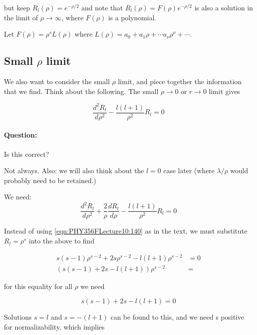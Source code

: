 but keep $R_l(\rho) = e^{-\rho/2}$ and note that $R_l(\rho) = F(\rho)e^{-\rho/2}$ is also a solution in the limit of $\rho \rightarrow \infty$, where $F(\rho)$ is a polynomial.

Let $F(\rho) = \rho^s L(\rho)$ where $L(\rho) = a_0 + a_1 \rho + \cdots a_\nu \rho^\nu + \cdots$.

\subsection{Small \texorpdfstring{$\rho$}{rho} limit}

We also want to consider the small $\rho$ limit, and piece together the information that we find.  Think about the following.  The small $\rho \rightarrow 0$ or $r \rightarrow 0$ limit gives

\begin{equation}\label{eqn:PHY356FLecture10:140}
\frac{d^2 R_l}{d\rho^2} - \frac{l(l+1)}{\rho^2} R_l = 0
\end{equation}

\paragraph{Question:} Is this correct?

Not always.  Also: we will also think about the $l=0$ case later (where $\lambda/\rho$ would probably need to be retained.)

We need:
\begin{equation}\label{eqn:PHY356FLecture10:140b}
\frac{d^2 R_l}{d\rho^2} + \frac{2}{\rho} \frac{d R_l}{d\rho} - \frac{l(l+1)}{\rho^2} R_l = 0
\end{equation}

Instead of using \ref{eqn:PHY356FLecture10:140} as in the text, we must substitute $R_l = \rho^s$ into the above to find

\begin{align}\label{eqn:PHY356FLecture10:150}
s(s-1) \rho^{s-2} + 2 s \rho^{s-2} - l(l+1) \rho^{s-2} &= 0 \\
\left( s(s-1) + 2 s - l(l+1) \right) \rho^{s-2} &=
\end{align}

for this equality for all $\rho$ we need

\begin{equation}\label{eqn:PHY356FLecture10:160}
s(s-1) + 2 s - l(l+1) = 0
\end{equation}

Solutions $s = l$ and $s = -(l+1)$ can be found to this, and we need s positive for normalizability, which implies

